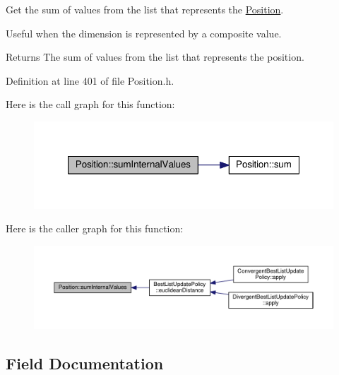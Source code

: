 Get the sum of values from the list that represents the \hyperlink{structPosition}{Position}. 

Useful when the dimension is represented by a composite value.

\begin{DoxyReturn}{Returns}
The sum of values from the list that represents the position. 
\end{DoxyReturn}


Definition at line 401 of file Position.\+h.



Here is the call graph for this function\+:\nopagebreak
\begin{figure}[H]
\begin{center}
\leavevmode
\includegraphics[width=347pt]{structPosition_a8f9b5812209642cb31de38d3745cfc16_cgraph}
\end{center}
\end{figure}




Here is the caller graph for this function\+:\nopagebreak
\begin{figure}[H]
\begin{center}
\leavevmode
\includegraphics[width=350pt]{structPosition_a8f9b5812209642cb31de38d3745cfc16_icgraph}
\end{center}
\end{figure}




\subsection{Field Documentation}
